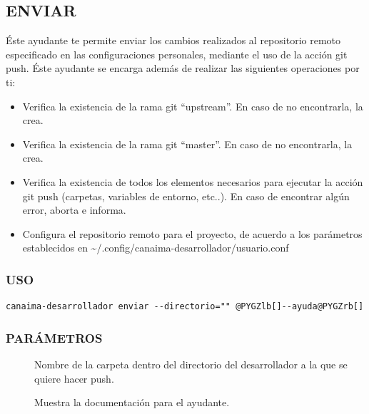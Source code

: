 \documentclass[letterpaper,12pt,spanish]{manual}
\begin{document}
\subsection{\textbf{ENVIAR}}

Éste ayudante te permite enviar los cambios realizados al repositorio remoto especificado en las configuraciones personales, mediante el uso de la acción git push. Éste ayudante se encarga además de realizar las siguientes operaciones por ti:
\begin{itemize}
\item {} 
Verifica la existencia de la rama git ``upstream''. En caso de no encontrarla, la crea.

\item {} 
Verifica la existencia de la rama git ``master''. En caso de no encontrarla, la crea.

\item {} 
Verifica la existencia de todos los elementos necesarios para ejecutar la acción git push (carpetas, variables de entorno, etc..). En caso de encontrar algún error, aborta e informa.

\item {} 
Configura el repositorio remoto para el proyecto, de acuerdo a los parámetros establecidos en \textasciitilde{}/.config/canaima-desarrollador/usuario.conf

\end{itemize}


\subsubsection{USO}

\begin{Verbatim}[commandchars=@\[\]]
canaima-desarrollador enviar --directorio="" @PYGZlb[]--ayuda@PYGZrb[]
\end{Verbatim}


\subsubsection{PARÁMETROS}
\begin{description}
\item[{}] \leavevmode
Nombre de la carpeta dentro del directorio del desarrollador a la que se quiere hacer push.

\item[{}] \leavevmode
Muestra la documentación para el ayudante.

\end{description}
\end{document}
